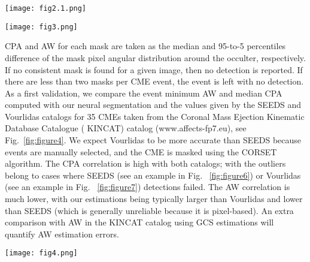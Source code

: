 \documentclass[baaa]{baaa}
\begin{document}
\begin{figure*}
  \centering
  \texttt{[image: fig2.1.png]}
  \caption{Masks found in real \textit{LASCO C2} differential images acquired on 24 April 2013 at 06:59 UT (a) and 07:23 UT (b).  We show only masks with score $>$ 0.25.  The final selected masks are presented in panels (c) and (d). The corresponding rectangular bounding boxes are computed from the masks using the Python function \textsc{cv2.boundingRect()}. }
  \label{fig:figure2.1}
\end{figure*}

\begin{figure*}
  \centering
  \texttt{[image: fig3.png]}
  \caption{\textit{SOHO}/\textit{LASCO} C2 24 April 2013 at 04:23 UT  showing the masks found for two CMEs }
  \label{fig:figure3}
\end{figure*}

CPA and AW for each mask are taken as the median and 95-to-5 percentiles difference of the mask pixel angular distribution around the occulter, respectively.  If no consistent mask is found for a given image, then no detection is reported. If there are less than two masks per CME event, the event is left with no detection.
As a first validation, we compare the event minimum AW and median CPA computed with our neural segmentation and the values given by the SEEDS and Vourlidas \citep{vourlidas2017} catalogs for 35 CMEs taken from the Coronal Mass Ejection Kinematic Database Catalogue (\textsc{ KINCAT}) catalog (www.affects-fp7.eu), see Fig.~\ref{fig:figure4}. We expect Vourlidas to be more accurate than SEEDS because events are manually selected, and the CME is masked using the CORSET algorithm. The CPA correlation is high with both catalogs; with the outliers belong to cases where SEEDS (see an example in Fig. ~\ref{fig:figure6}) or Vourlidas (see an example in Fig. ~\ref{fig:figure7}) detections failed. The AW correlation is much lower, with our estimations being typically larger than Vourlidas and lower than SEEDS (which is generally unreliable because it is pixel-based). An extra comparison with AW in the \textsc{KINCAT} catalog using GCS estimations will quantify AW estimation errors.

\begin{figure*}
  \centering
  \texttt{[image: fig4.png]}
  \caption{CPA (left) and AW (right) estimated with SEEDS and Vourlidas (see the legend) vs. our estimation (horizontal axis).  The outliers in CPA are shown in Figs. 5 to 8. }
  \label{fig:figure4}
\end{figure*}
\end{document}
